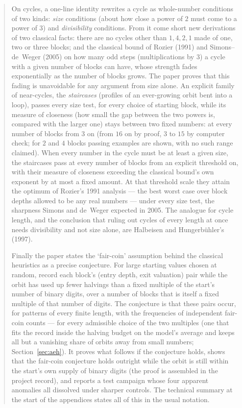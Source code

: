 \documentclass[11pt]{article}
\theoremstyle{remark}
\begin{document}
\begin{abstract}
On cycles, a one-line identity rewrites a cycle as whole-number conditions of two kinds: \emph{size} conditions (about how close a power of $2$ must come to a power of $3$) and \emph{divisibility} conditions. From it come short new derivations of two classical facts: there are no cycles other than $1, 4, 2, 1$ made of one, two or three blocks; and the classical bound of Rozier (1991) and Simons--de~Weger (2005) on how many odd steps (multiplications by $3$) a cycle with a given number of blocks can have, whose strength fades exponentially as the number of blocks grows. The paper proves that this fading is unavoidable for any argument from size alone. An explicit family of near-cycles, the \emph{staircases} (profiles of an ever-growing orbit bent into a loop), passes every size test, for every choice of starting block, while its measure of closeness (how small the gap between the two powers is, compared with the larger one) stays between two fixed numbers: at every number of blocks from $3$ on (from $16$ on by proof, $3$ to $15$ by computer check; for $2$ and $4$ blocks passing examples are shown, with no such range claimed). When every number in the cycle must be at least a given size, the staircases pass at every number of blocks from an explicit threshold on, with their measure of closeness exceeding the classical bound's own exponent by at most a fixed amount. At that threshold scale they attain the optimum of Rozier's 1991 analysis --- the best worst case over block depths allowed to be any real numbers --- under every size test, the sharpness Simons and de~Weger expected in 2005. The analogue for cycle length, and the conclusion that ruling out cycles of every length at once needs divisibility and not size alone, are Halbeisen and Hungerb\"uhler's (1997).

Finally the paper states the `fair-coin' assumption behind the classical heuristics as a precise conjecture. For large starting values chosen at random, record each block's (entry depth, exit valuation) pair while the orbit has used up fewer halvings than a fixed multiple of the start's number of binary digits, over a number of blocks that is itself a fixed multiple of that number of digits. The conjecture is that these pairs occur, for patterns of every finite length, with the frequencies of independent fair-coin counts --- for every admissible choice of the two multiples (one that fits the record inside the halving budget on the model's average and keeps all but a vanishing share of orbits away from small numbers; Section~\ref{sec:aeh}). It proves what follows if the conjecture holds, shows that the fair-coin conjecture holds outright while the orbit is still within the start's own supply of binary digits (the proof is assembled in the project record), and reports a test campaign whose four apparent anomalies all dissolved under sharper controls. The technical summary at the start of the appendices states all of this in the usual notation.
\end{abstract}
\end{document}
